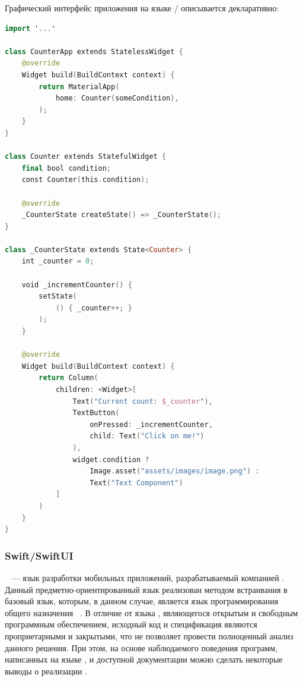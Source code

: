 Графический интерфейс приложения на языке /
описывается декларативно:
\begin{lstlisting}[language=Swift,caption=Счётчик нажатия кнопки на языке
\name{Dart}/\name{Flutter},label={lst:flutter-example}]
import '...'

class CounterApp extends StatelessWidget {
    @override
    Widget build(BuildContext context) {
        return MaterialApp(
            home: Counter(someCondition),
        );
    }
}

class Counter extends StatefulWidget {
    final bool condition;
    const Counter(this.condition);
    
    @override
    _CounterState createState() => _CounterState();
}

class _CounterState extends State<Counter> {
    int _counter = 0;
    
    void _incrementCounter() {
        setState(
            () { _counter++; }
        );
    }
    
    @override
    Widget build(BuildContext context) {
        return Column(
            children: <Widget>[
                Text("Current count: $_counter"),
                TextButton(
                    onPressed: _incrementCounter,
                    child: Text("Click on me!")
                ),
                widget.condition ?
                    Image.asset("assets/images/image.png") :
                    Text("Text Component")
            ]
        )
    }
}
\end{lstlisting}

\subsubsection*{Swift/SwiftUI}
~\cite{swiftui-homepage} --- язык разработки мобильных
приложений, разрабатываемый компанией . Данный
предметно-ориентированный язык реализован методом встраивания в базовый
язык, которым, в данном случае, является язык программирования общего
назначения ~\cite{swift-homepage}. В отличие от языка
, являющегося открытым и свободным программным обеспечением,
исходный код и спецификация  являются проприетарными и
закрытыми, что не позволяет провести полноценный анализ данного решения.
При этом, на основе наблюдаемого поведения программ, написанных на языке
, и доступной документации можно сделать некоторые выводы о
реализации .

